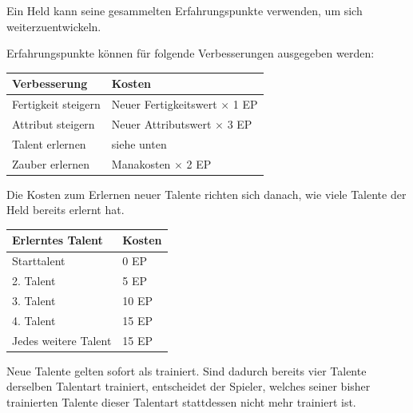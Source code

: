 Ein Held kann seine gesammelten Erfahrungspunkte verwenden, um sich weiterzuentwickeln.

Erfahrungspunkte können für folgende Verbesserungen ausgegeben werden:

\begin{center}
\begin{tabular}{ll}
\textbf{Verbesserung} & \textbf{Kosten} \\
\hline
Fertigkeit steigern & Neuer Fertigkeitswert $\times$ 1 EP \\
Attribut steigern & Neuer Attributswert $\times$ 3 EP \\
Talent erlernen & siehe unten \\
Zauber erlernen & Manakosten $\times$ 2 EP \\
\end{tabular}
\end{center}

Die Kosten zum Erlernen neuer Talente richten sich danach, wie viele Talente der Held bereits erlernt hat.

\begin{center}
\begin{tabular}{ll}
\textbf{Erlerntes Talent} & \textbf{Kosten} \\
\hline
Starttalent & 0 EP \\
2. Talent & 5 EP \\
3. Talent & 10 EP \\
4. Talent & 15 EP \\
Jedes weitere Talent & 15 EP \\
\end{tabular}
\end{center}

Neue Talente gelten sofort als trainiert. Sind dadurch bereits vier Talente derselben Talentart trainiert, entscheidet der Spieler, welches seiner bisher trainierten Talente dieser Talentart stattdessen nicht mehr trainiert ist.
